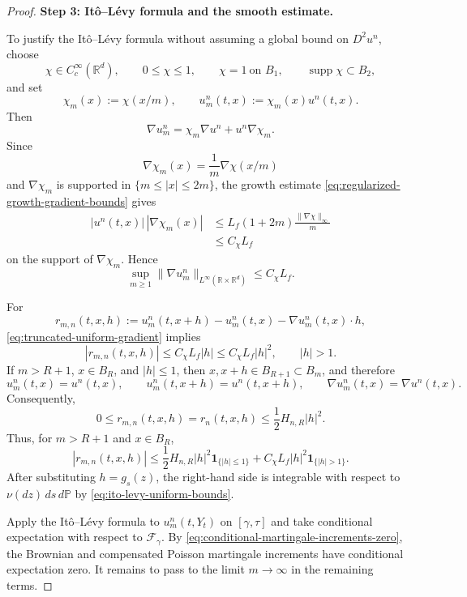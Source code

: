 \documentclass[12pt,oneside, reqno]{amsart}
\numberwithin{equation}{section}
\begin{document}
\begin{proof}
	

	\textbf{Step 3: It\^o--L\'evy formula and the smooth estimate.}
	
	To justify the It\^o--L\'evy formula without assuming a global bound
	on \(D^2u^n\), choose
	\[
	\chi\in C_c^\infty(\mathbb R^d),
	\qquad
	0\leq\chi\leq1,
	\qquad
	\chi=1\ \text{on }B_1,
	\qquad
	\operatorname{supp}\chi\subset B_2,
	\]
	and set
	\[
	\chi_m(x):=\chi(x/m),
	\qquad
	u_m^n(t,x):=\chi_m(x)u^n(t,x).
	\]
	Then
	\[
	\nabla u_m^n
	=
	\chi_m\nabla u^n
	+
	u^n\nabla\chi_m.
	\]
	Since
	\[
	\nabla\chi_m(x)
	=
	\frac1m\nabla\chi(x/m)
	\]
	and \(\nabla\chi_m\) is supported in
	\(\{m\leq|x|\leq2m\}\), the growth estimate
	\eqref{eq:regularized-growth-gradient-bounds} gives
	\[
	\begin{aligned}
		|u^n(t,x)|\,|\nabla\chi_m(x)|
		&\leq
		L_f(1+2m)
		\frac{\|\nabla\chi\|_\infty}{m}
		\\
		&\leq
		C_\chi L_f
	\end{aligned}
	\]
	on the support of \(\nabla\chi_m\). Hence
	\begin{equation}
		\label{eq:truncated-uniform-gradient}
		\sup_{m\geq1}
		\|\nabla u_m^n\|_{L^\infty(\mathbb R\times\mathbb R^d)}
		\leq
		C_\chi L_f.
	\end{equation}
	
	For
	\[
	r_{m,n}(t,x,h)
	:=
	u_m^n(t,x+h)
	-u_m^n(t,x)
	-\nabla u_m^n(t,x)\cdot h,
	\]
	\eqref{eq:truncated-uniform-gradient} implies
	\[
	|r_{m,n}(t,x,h)|
	\leq
	C_\chi L_f|h|
	\leq
	C_\chi L_f|h|^2,
	\qquad |h|>1.
	\]
	If \(m>R+1\), \(x\in B_R\), and \(|h|\leq1\), then
	\(x,x+h\in B_{R+1}\subset B_m\), and therefore
	\[
	u_m^n(t,x)=u^n(t,x),
	\qquad
	u_m^n(t,x+h)=u^n(t,x+h),
	\qquad
	\nabla u_m^n(t,x)=\nabla u^n(t,x).
	\]
	Consequently,
	\[
	0
	\leq
	r_{m,n}(t,x,h)
	=
	r_n(t,x,h)
	\leq
	\frac12H_{n,R}|h|^2.
	\]
	Thus, for \(m>R+1\) and \(x\in B_R\),
	\begin{equation}
		\label{eq:truncated-jump-dominator}
		|r_{m,n}(t,x,h)|
		\leq
		\frac12H_{n,R}|h|^2
		\mathbf1_{\{|h|\leq1\}}
		+
		C_\chi L_f|h|^2
		\mathbf1_{\{|h|>1\}}.
	\end{equation}
	After substituting \(h=g_s(z)\), the right-hand side is integrable
	with respect to
	\(\nu(dz)\,ds\,d\mathbb P\) by
	\eqref{eq:ito-levy-uniform-bounds}.
	
Apply the It\^o--L\'evy formula to \(u_m^n(t,Y_t)\) on
\([\gamma,\tau]\) and take conditional expectation with respect to
\(\mathcal F_\gamma\). By
\eqref{eq:conditional-martingale-increments-zero}, the Brownian and
compensated Poisson martingale increments have conditional expectation
zero. It remains to pass to the limit \(m\to\infty\) in the remaining
terms.


\end{proof}
\end{document}
